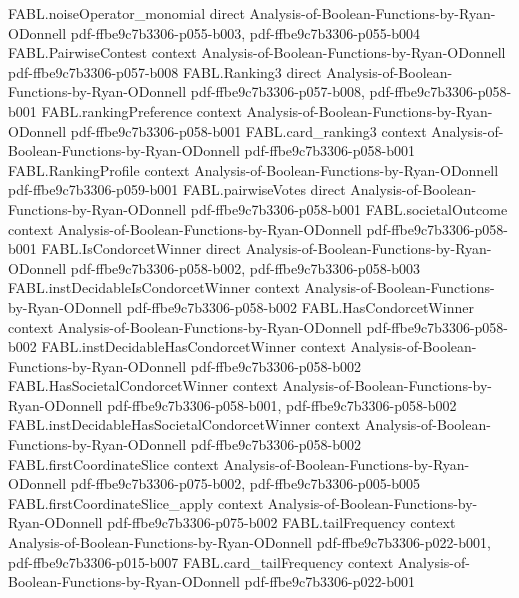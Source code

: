 \begin{theorem}
\proofstep
  {FABL.noiseOperator_monomial}
  {direct}
  {Analysis-of-Boolean-Functions-by-Ryan-ODonnell}
  {pdf-ffbe9c7b3306-p055-b003,
    pdf-ffbe9c7b3306-p055-b004}
\proofstep
  {FABL.PairwiseContest}
  {context}
  {Analysis-of-Boolean-Functions-by-Ryan-ODonnell}
  {pdf-ffbe9c7b3306-p057-b008}
\proofstep
  {FABL.Ranking3}
  {direct}
  {Analysis-of-Boolean-Functions-by-Ryan-ODonnell}
  {pdf-ffbe9c7b3306-p057-b008,
    pdf-ffbe9c7b3306-p058-b001}
\proofstep
  {FABL.rankingPreference}
  {context}
  {Analysis-of-Boolean-Functions-by-Ryan-ODonnell}
  {pdf-ffbe9c7b3306-p058-b001}
\proofstep
  {FABL.card_ranking3}
  {context}
  {Analysis-of-Boolean-Functions-by-Ryan-ODonnell}
  {pdf-ffbe9c7b3306-p058-b001}
\proofstep
  {FABL.RankingProfile}
  {context}
  {Analysis-of-Boolean-Functions-by-Ryan-ODonnell}
  {pdf-ffbe9c7b3306-p059-b001}
\proofstep
  {FABL.pairwiseVotes}
  {direct}
  {Analysis-of-Boolean-Functions-by-Ryan-ODonnell}
  {pdf-ffbe9c7b3306-p058-b001}
\proofstep
  {FABL.societalOutcome}
  {context}
  {Analysis-of-Boolean-Functions-by-Ryan-ODonnell}
  {pdf-ffbe9c7b3306-p058-b001}
\proofstep
  {FABL.IsCondorcetWinner}
  {direct}
  {Analysis-of-Boolean-Functions-by-Ryan-ODonnell}
  {pdf-ffbe9c7b3306-p058-b002,
    pdf-ffbe9c7b3306-p058-b003}
\proofstep
  {FABL.instDecidableIsCondorcetWinner}
  {context}
  {Analysis-of-Boolean-Functions-by-Ryan-ODonnell}
  {pdf-ffbe9c7b3306-p058-b002}
\proofstep
  {FABL.HasCondorcetWinner}
  {context}
  {Analysis-of-Boolean-Functions-by-Ryan-ODonnell}
  {pdf-ffbe9c7b3306-p058-b002}
\proofstep
  {FABL.instDecidableHasCondorcetWinner}
  {context}
  {Analysis-of-Boolean-Functions-by-Ryan-ODonnell}
  {pdf-ffbe9c7b3306-p058-b002}
\proofstep
  {FABL.HasSocietalCondorcetWinner}
  {context}
  {Analysis-of-Boolean-Functions-by-Ryan-ODonnell}
  {pdf-ffbe9c7b3306-p058-b001,
    pdf-ffbe9c7b3306-p058-b002}
\proofstep
  {FABL.instDecidableHasSocietalCondorcetWinner}
  {context}
  {Analysis-of-Boolean-Functions-by-Ryan-ODonnell}
  {pdf-ffbe9c7b3306-p058-b002}
\proofstep
  {FABL.firstCoordinateSlice}
  {context}
  {Analysis-of-Boolean-Functions-by-Ryan-ODonnell}
  {pdf-ffbe9c7b3306-p075-b002,
    pdf-ffbe9c7b3306-p005-b005}
\proofstep
  {FABL.firstCoordinateSlice_apply}
  {context}
  {Analysis-of-Boolean-Functions-by-Ryan-ODonnell}
  {pdf-ffbe9c7b3306-p075-b002}
\proofstep
  {FABL.tailFrequency}
  {context}
  {Analysis-of-Boolean-Functions-by-Ryan-ODonnell}
  {pdf-ffbe9c7b3306-p022-b001,
    pdf-ffbe9c7b3306-p015-b007}
\proofstep
  {FABL.card_tailFrequency}
  {context}
  {Analysis-of-Boolean-Functions-by-Ryan-ODonnell}
  {pdf-ffbe9c7b3306-p022-b001}

\end{theorem}
